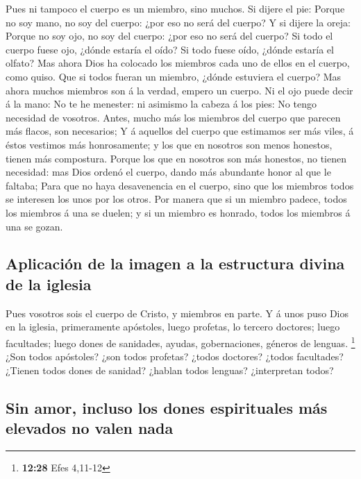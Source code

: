  Pues ni tampoco el cuerpo es un miembro, sino muchos.
 Si dijere el pie: Porque no soy mano, no soy del cuerpo:
¿por eso no será del cuerpo?  Y si dijere la oreja:
Porque no soy ojo, no soy del cuerpo: ¿por eso no será del cuerpo?
 Si todo el cuerpo fuese ojo, ¿dónde estaría el oído? Si
todo fuese oído, ¿dónde estaría el olfato?  Mas ahora
Dios ha colocado los miembros cada uno de ellos en el cuerpo, como
quiso.  Que si todos fueran un miembro, ¿dónde estuviera
el cuerpo?  Mas ahora muchos miembros son á la verdad,
empero un cuerpo.  Ni el ojo puede decir á la mano: No te
he menester: ni asimismo la cabeza á los pies: No tengo necesidad de
vosotros.  Antes, mucho más los miembros del cuerpo que
parecen más flacos, son necesarios;  Y á aquellos del
cuerpo que estimamos ser más viles, á éstos vestimos más honrosamente; y
los que en nosotros son menos honestos, tienen más compostura.
 Porque los que en nosotros son más honestos, no tienen
necesidad: mas Dios ordenó el cuerpo, dando más abundante honor al que
le faltaba;  Para que no haya desavenencia en el cuerpo,
sino que los miembros todos se interesen los unos por los otros.
 Por manera que si un miembro padece, todos los miembros
á una se duelen; y si un miembro es honrado, todos los miembros á una se
gozan.

\hypertarget{aplicaciuxf3n-de-la-imagen-a-la-estructura-divina-de-la-iglesia}{%
\subsection{Aplicación de la imagen a la estructura divina de la
iglesia}\label{aplicaciuxf3n-de-la-imagen-a-la-estructura-divina-de-la-iglesia}}

 Pues vosotros sois el cuerpo de Cristo, y miembros en
parte.  Y á unos puso Dios en la iglesia, primeramente
apóstoles, luego profetas, lo tercero doctores; luego facultades; luego
dones de sanidades, ayudas, gobernaciones, géneros de lenguas.
\footnote{\textbf{12:28} Efes 4,11-12}  ¿Son todos
apóstoles? ¿son todos profetas? ¿todos doctores? ¿todos facultades?
 ¿Tienen todos dones de sanidad? ¿hablan todos lenguas?
¿interpretan todos?

\hypertarget{sin-amor-incluso-los-dones-espirituales-muxe1s-elevados-no-valen-nada}{%
\subsection{Sin amor, incluso los dones espirituales más elevados no
valen
nada}\label{sin-amor-incluso-los-dones-espirituales-muxe1s-elevados-no-valen-nada}}

